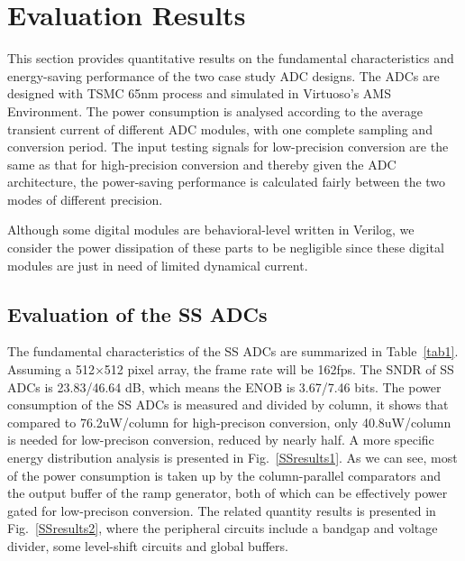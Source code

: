 \section{Evaluation Results}\label{result}

This section provides quantitative results on the fundamental characteristics and energy-saving performance of the two case study ADC designs. 
The ADCs are designed with TSMC 65nm process and simulated in Virtuoso’s AMS Environment. 
The power consumption is analysed according to the average transient current of different ADC modules, with one complete sampling and conversion period.
The input testing signals for low-precision conversion are the same as that for high-precision conversion and thereby given the ADC architecture, the power-saving performance is calculated fairly between the two modes of different precision.

Although some digital modules are behavioral-level written in Verilog, we consider the power dissipation of these parts to be negligible 
since these digital modules are just in need of limited dynamical current.

\subsection{Evaluation of the SS ADCs}

The fundamental characteristics of the SS ADCs are summarized in Table~\ref{tab1}. Assuming a 512×512 pixel array, the frame rate will be 162fps.
The SNDR of SS ADCs is 23.83/46.64 dB, which means the ENOB is 3.67/7.46 bits. 
The power consumption of the SS ADCs is measured and divided by column, 
it shows that compared to 76.2uW/column for high-precison conversion, only 40.8uW/column is needed for low-precison conversion, reduced by nearly half. 
A more specific energy distribution analysis is presented in Fig.~\ref{SSresults1}. 
As we can see, most of the power consumption is taken up by the column-parallel comparators and the output buffer of the ramp generator, 
both of which can be effectively power gated for low-precison conversion. 
The related quantity results is presented in Fig.~\ref{SSresults2}, 
where the peripheral circuits include a bandgap and voltage divider, some level-shift circuits and global buffers.

